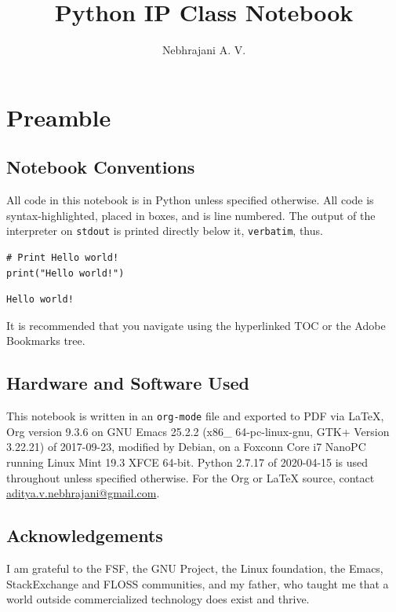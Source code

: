 \documentclass[11pt]{article}
\author{Nebhrajani A. V.}
\date{}
\title{Python IP Class Notebook}
\begin{document}
\maketitle
\tableofcontents

\newpage

\section{Preamble}
\label{sec:orgce036ea}
\subsection{Notebook Conventions}
\label{sec:org2321fb9}
All code in this notebook is in Python unless specified otherwise.
All code is syntax-highlighted, placed in boxes, and is line
numbered. The output of the interpreter on \texttt{stdout} is printed directly below it,
\texttt{verbatim}, thus.
\begin{verbatim}
# Print Hello world!
print("Hello world!")
\end{verbatim}

\begin{verbatim}
Hello world!
\end{verbatim}


It is recommended that you navigate using the hyperlinked TOC or the Adobe
Bookmarks tree.

\subsection{Hardware and Software Used}
\label{sec:orgb03c5ed}

 This notebook is written in an \texttt{org-mode} file and exported to PDF via \LaTeX{}, Org version 9.3.6 on
GNU Emacs 25.2.2 (x86\_ 64-pc-linux-gnu, GTK+ Version 3.22.21) of
2017-09-23, modified by Debian, on a Foxconn Core i7 NanoPC running Linux
Mint 19.3 XFCE 64-bit. Python 2.7.17 of 2020-04-15 is used
throughout unless specified otherwise. For the Org or \LaTeX{} source, contact
\href{mailto:aditya.v.nebhrajani@gmail.com}{aditya.v.nebhrajani@gmail.com}.

\subsection{Acknowledgements}
\label{sec:org0c5072d}
I am grateful to the FSF, the GNU Project, the Linux foundation,
the Emacs, StackExchange and FLOSS communities, and my father,
who taught me that a world outside commercialized technology does
exist and thrive.
\newpage
\end{document}
